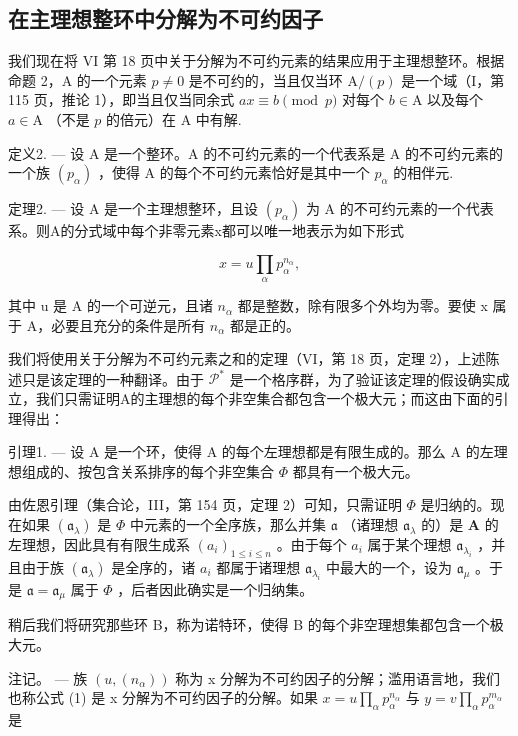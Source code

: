 \subsection{在主理想整环中分解为不可约因子}

我们现在将 VI 第 18 页中关于分解为不可约元素的结果应用于主理想整环。根据命题 2，A 的一个元素 \(p \neq 0\) 是不可约的，当且仅当环 \(\mathrm{A}/(p)\) 是一个域（I，第 115 页，推论 1），即当且仅当同余式 \(ax \equiv b \pmod{p}\) 对每个 \(b \in \mathrm{A}\) 以及每个 \(a \in \mathrm{A}\) （不是 \(p\) 的倍元）在 A 中有解.

定义2. --- 设 A 是一个整环。A 的不可约元素的一个代表系是 A 的不可约元素的一个族 \((p_{\alpha})\) ，使得 A 的每个不可约元素恰好是其中一个 \(p_{\alpha}\) 的相伴元.

定理2. --- 设 A 是一个主理想整环，且设 \((p_{\alpha})\) 为 A 的不可约元素的一个代表系。则A的分式域中每个非零元素x都可以唯一地表示为如下形式

\[
x = u \prod_ {\alpha} p _ {\alpha} ^ {n _ {\alpha}},\tag{1}
\]

其中 u 是 A 的一个可逆元，且诸 \(n_{\alpha}\) 都是整数，除有限多个外均为零。要使 x 属于 A，必要且充分的条件是所有 \(n_{\alpha}\) 都是正的。

我们将使用关于分解为不可约元素之和的定理（VI，第 18 页，定理 2），上述陈述只是该定理的一种翻译。由于 \(\mathcal{P}^*\) 是一个格序群，为了验证该定理的假设确实成立，我们只需证明A的主理想的每个非空集合都包含一个极大元；而这由下面的引理得出：

引理1. --- 设 A 是一个环，使得 A 的每个左理想都是有限生成的。那么 A 的左理想组成的、按包含关系排序的每个非空集合 \(\Phi\) 都具有一个极大元。

由佐恩引理（集合论，III，第 154 页，定理 2）可知，只需证明 \(\Phi\) 是归纳的。现在如果 \((\mathfrak{a}_{\lambda})\) 是 \(\Phi\) 中元素的一个全序族，那么并集 \(\mathfrak{a}\) （诸理想 \(\mathfrak{a}_{\lambda}\) 的）是 \(\mathbf{A}\) 的左理想，因此具有有限生成系 \((a_i)_{1 \leqslant i \leqslant n}\) 。由于每个 \(a_i\) 属于某个理想 \(\mathfrak{a}_{\lambda_i}\) ，并且由于族 \((\mathfrak{a}_{\lambda})\) 是全序的，诸 \(a_i\) 都属于诸理想 \(\mathfrak{a}_{\lambda_i}\) 中最大的一个，设为 \(\mathfrak{a}_{\mu}\) 。于是 \(\mathfrak{a} = \mathfrak{a}_{\mu}\) 属于 \(\Phi\) ，后者因此确实是一个归纳集。

稍后我们将研究那些环 B，称为诺特环，使得 B 的每个非空理想集都包含一个极大元。

注记。 --- 族 \((u, (n_{\alpha}))\) 称为 x 分解为不可约因子的分解；滥用语言地，我们也称公式 (1) 是 x 分解为不可约因子的分解。如果 \(x = u \prod_{\alpha} p_{\alpha}^{n_{\alpha}}\) 与 \(y = v \prod_{\alpha} p_{\alpha}^{m_{\alpha}}\) 是

